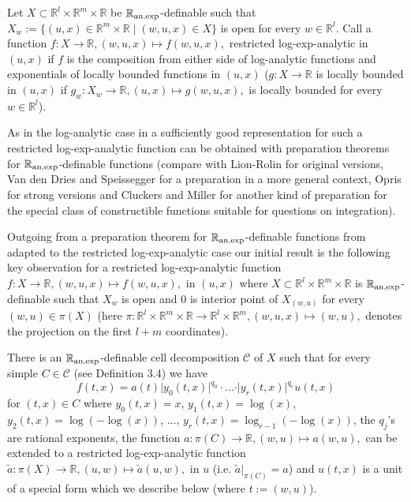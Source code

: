 \documentclass[12pt]{article}
\def\vs{\vspace}
\begin{document}
\vs{0.2cm}
Let $X \subset \mathbb{R}^l \times \mathbb{R}^m \times \mathbb{R}$ be $\mathbb{R}_{\textnormal{an,exp}}$-definable such that $X_w:=\{(u,x) \in \mathbb{R}^m \times \mathbb{R} \mid (w,u,x) \in X\}$ is open for every $w \in \mathbb{R}^l$. Call a function $f:X \to \mathbb{R}, (w,u,x) \mapsto f(w,u,x),$ restricted log-exp-analytic in $(u,x)$ if $f$ is the composition from either side of log-analytic functions and exponentials of locally bounded functions in $(u,x)$ ($g:X \to \mathbb{R}$ is locally bounded in $(u,x)$ if $g_w:X_w \to \mathbb{R}, (u,x) \mapsto g(w,u,x),$ is locally bounded for every $w \in \mathbb{R}^l$).

\vs{0.1cm}
As in the log-analytic case in \cite{7} a sufficiently good representation for such a restricted log-exp-analytic function can be obtained with preparation theorems for $\mathbb{R}_{\textnormal{an,exp}}$-definable functions (compare with Lion-Rolin \cite{8} for original versions, Van den Dries and Speissegger \cite{6} for a preparation in a more general context, Opris \cite{10} for strong versions and Cluckers and Miller \cite{1} for another kind of preparation for the special class of constructible functions suitable for questions on integration). 

\vs{0.1cm}
Outgoing from a preparation theorem for $\mathbb{R}_{\textnormal{an,exp}}$-definable functions from \cite{10} adapted to the restricted log-exp-analytic case our initial result is the following key observation for a restricted log-exp-analytic function $f:X \to \mathbb{R}, (w,u,x) \mapsto f(w,u,x),$ in $(u,x)$ where $X \subset \mathbb{R}^l \times \mathbb{R}^m \times \mathbb{R}$ is $\mathbb{R}_{\textnormal{an,exp}}$-definable such that $X_w$ is open and $0$ is interior point of $X_{(w,u)}$ for every $(w,u) \in \pi(X)$ (here $\pi:\mathbb{R}^l \times \mathbb{R}^m \times \mathbb{R} \to \mathbb{R}^l \times \mathbb{R}^m, (w,u,x) \mapsto (w,u),$ denotes the projection on the first $l+m$ coordinates).

\vs{0.1cm}
There is an $\mathbb{R}_{\textnormal{an,exp}}$-definable cell decomposition $\mathcal{C}$ of $X$ such that for every simple $C \in \mathcal{C}$ (see Definition 3.4) we have
$$f(t,x)=a(t)\vert{y_0(t,x)}\vert^{q_0} \cdot ... \cdot \vert{y_r(t,x)}\vert^{q_r}u(t,x)$$
for $(t,x) \in C$ where $y_0(t,x)=x$, $y_1(t,x)=\log(x)$, $y_2(t,x)=\log(-\log(x))$,
..., $y_r(t,x)=\log_{r-1}(-\log(x))$, the $q_j$'s are rational exponents, the function $a: \pi(C) \to \mathbb{R}, (w,u) \mapsto a(w,u),$ can be extended to a restricted log-exp-analytic function $\tilde{a}:\pi(X) \to \mathbb{R},(u,w) \mapsto \tilde{a}(u,w),$ in $u$ (i.e. $\tilde{a}|_{\pi(C)} = a$) and $u(t,x)$ is a unit of a special form which we describe below (where $t:=(w,u)$). 
\end{document}
